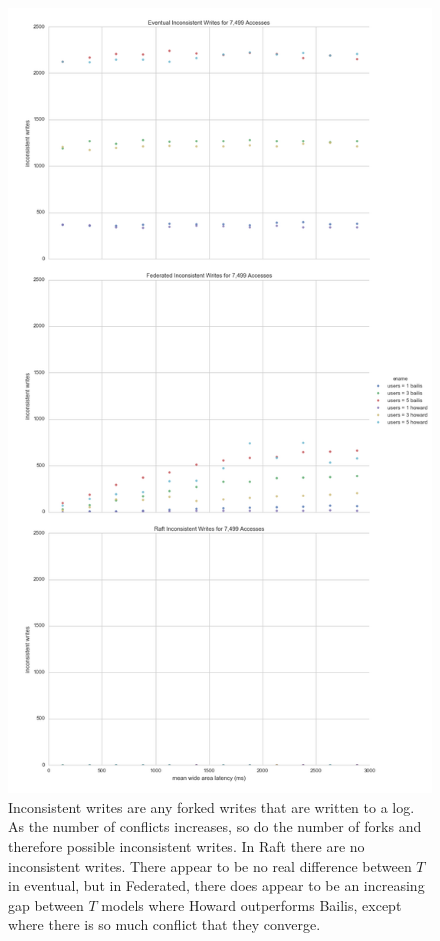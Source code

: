 \documentclass[10pt,letterpaper]{article}
\begin{document}
\begin{figure}[!h]
    \centering
        \includegraphics[height=0.9\textheight]{figures/inconsistent_writes.png}
        \caption{\textsf{Inconsistent writes are any forked writes that are written to a log. As the number of conflicts increases, so do the number of forks and therefore possible inconsistent writes. In Raft there are no inconsistent writes. There appear to be no real difference between $T$ in eventual, but in Federated, there does appear to be an increasing gap between $T$ models where Howard outperforms Bailis, except where there is so much conflict that they converge.}}
        \label{fig:inconsistent_writes}
\end{figure}
\end{document}

